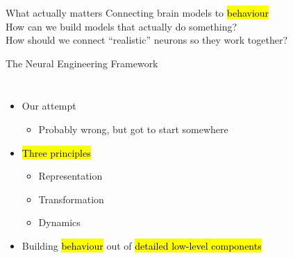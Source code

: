 \documentclass[handout,aspectratio=169]{beamer}
\begin{document}
\begin{frame}{What actually matters\textellipsis}
	Connecting brain models to \hl{behaviour}\\[0.25cm]
	\pause
	How can we build models that actually do something?\\[0.25cm]
	\pause
	How should we connect \enquote{realistic} neurons so they work together?\\[0.25cm]
\end{frame}

\begin{frame}{The Neural Engineering Framework}
	\begin{columns}
		\begin{itemize}
			\setlength{\itemsep}{0.25cm}
			\item Our attempt\\[0.125cm]
			\begin{itemize}
				\item Probably wrong, but got to start somewhere
			\end{itemize}
			\item \hl{Three principles}\\[0.125cm]
			\begin{itemize}
				\setlength{\itemsep}{0.25cm}
				\item Representation
				\item Transformation
				\item Dynamics
			\end{itemize}
			\item Building \hl{behaviour} out of \hl{detailed low-level components}
		\end{itemize}
		\fboxrule=0.4pt\fboxsep=0pt
	\end{columns}
\end{frame}
\end{document}
